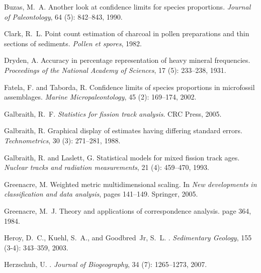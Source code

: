 \documentclass{article}
\begin{document}
\begin{thebibliography}{32}
Buzas, M.~A.
\newblock Another look at confidence limits for species proportions.
\newblock \emph{Journal of Paleontology}, 64 (5): 842--843,
  1990.

Clark, R.~L.
\newblock Point count estimation of charcoal in pollen preparations and thin
  sections of sediments.
\newblock \emph{Pollen et spores}, 1982.

Dryden, A.
\newblock Accuracy in percentage representation of heavy mineral frequencies.
\newblock \emph{Proceedings of the National Academy of Sciences}, 17
  (5): 233--238, 1931.

Fatela, F. and Taborda, R.
\newblock Confidence limits of species proportions in microfossil assemblages.
\newblock \emph{Marine Micropaleontology}, 45 (2): 169--174,
  2002.

Galbraith, R.~F.
\newblock \emph{Statistics for fission track analysis}.
\newblock CRC Press, 2005.

Galbraith, R.
\newblock Graphical display of estimates having differing standard errors.
\newblock \emph{Technometrics}, 30 (3): 271--281, 1988.

Galbraith, R. and Laslett, G.
\newblock Statistical models for mixed fission track ages.
\newblock \emph{Nuclear tracks and radiation measurements}, 21
  (4): 459--470, 1993.

Greenacre, M.
\newblock Weighted metric multidimensional scaling.
\newblock In \emph{New developments in classification and data analysis}, pages
  141--149. Springer, 2005.

Greenacre, M.~J.
\newblock Theory and applications of correspondence analysis.
\newblock page 364, 1984.

Heroy, D.~C., Kuehl, S.~A., and Goodbred~Jr, S.~L.
.
\newblock \emph{Sedimentary Geology}, 155 (3-4): 343--359,
  2003.

Herzschuh, U.
.
\newblock \emph{Journal of Biogeography}, 34 (7): 1265--1273,
  2007.


\end{thebibliography}
\end{document}
